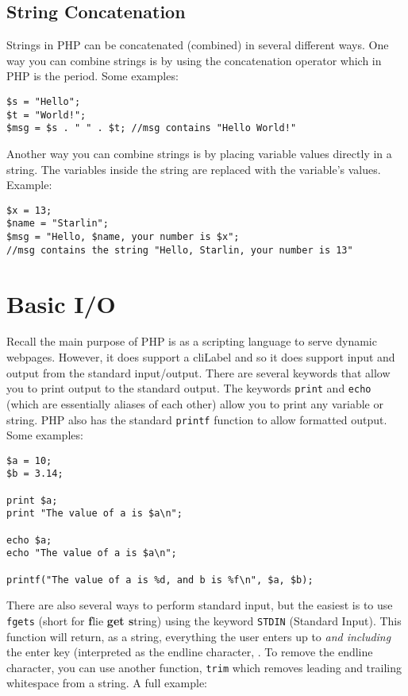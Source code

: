 \subsection{String Concatenation}

Strings in PHP can be concatenated (combined) in several different ways.
One way you can combine strings is by using the concatenation operator
which in PHP is the period.  Some examples:

\begin{verbatim}
$s = "Hello";
$t = "World!";
$msg = $s . " " . $t; //msg contains "Hello World!"
\end{verbatim}

Another way you can combine strings is by placing variable values directly
in a string.  The variables inside the string are replaced with the variable's 
values.  Example:

\begin{verbatim}
$x = 13;
$name = "Starlin";
$msg = "Hello, $name, your number is $x";
//msg contains the string "Hello, Starlin, your number is 13"
\end{verbatim}

\section{Basic I/O}

Recall the main purpose of PHP is as a scripting language to serve dynamic
webpages.  However, it does support a \gls{cliLabel} and so it does support
input and output from the standard input/output.  There are several
keywords that allow you to print output to the standard output.  The keywords
\texttt{print} and \texttt{echo} (which are essentially aliases
of each other) allow you to print any variable or string.  PHP also has the
standard \texttt{printf} function to allow formatted output.  Some
examples:

\begin{verbatim}
$a = 10;
$b = 3.14;

print $a;
print "The value of a is $a\n"; 

echo $a;
echo "The value of a is $a\n"; 

printf("The value of a is %d, and b is %f\n", $a, $b);
\end{verbatim}

There are also several ways to perform standard input, but the easiest is to
use \texttt{fgets} (short for \textbf{f}lie \textbf{get s}tring) using the
keyword \texttt{STDIN} (Standard Input).  This function will return, 
as a string, everything the user enters up to \emph{and including} the enter
key (interpreted as the endline character, \texttt{\n}.  To remove
the endline character, you can use another function, \texttt{trim}
which removes leading and trailing whitespace from a string.  A full example:

